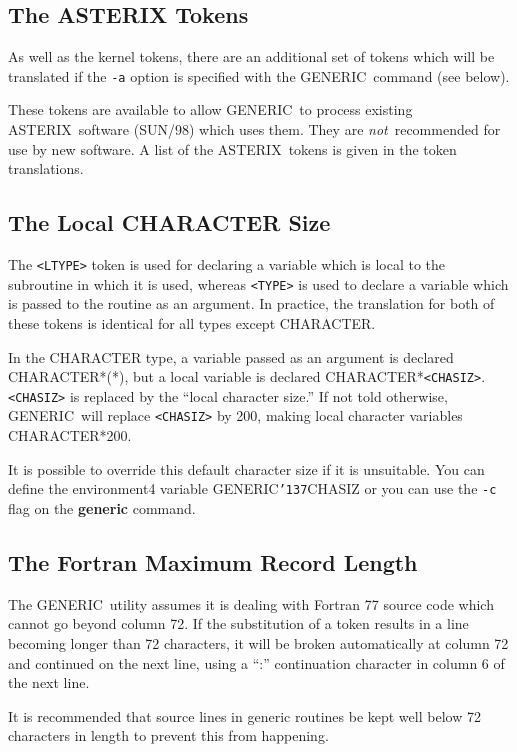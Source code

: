 \documentclass[twoside,11pt]{article}
\renewcommand{\_}{{\tt\char'137}}     %
\newcommand{\htmlref}[2]{#1}
\newcommand{\xref}[3]{#1}
\newcommand{\ASTERIX}{{\footnotesize ASTERIX}\normalsize}
\newcommand{\ASTERIXref}{\xref{\ASTERIX}{sun98}{}}
\newcommand{\GENERIC}{{\footnotesize GENERIC}\normalsize}
\newcommand{\latexelsehtml}[2]{#1}
\renewcommand{\latexelsehtml}[2]{#2}
\begin{document}
\subsection{The ASTERIX Tokens}

As well as the kernel tokens, there are an additional set of
tokens which will be translated if the {\tt -a} option is specified
with the \GENERIC\ command (see below).

These tokens are available to allow \GENERIC\ to process existing
\ASTERIXref\ software (SUN/98) which uses them.
They are {\em not}\ recommended for use by new software.
A list of the \ASTERIX\ tokens is given in 
\latexelsehtml{Appendix~\ref{ap_a}}{the
\htmlref{token translations}{ap_a}}.

\subsection{The Local CHARACTER Size}

The \verb+<LTYPE>+ token is used for declaring a variable which is local
to the subroutine in which it is used, whereas \verb+<TYPE>+ is used
to declare a variable which is passed to the routine as an argument.
In practice, the translation for both of these tokens is identical
for all types except CHARACTER.

In the CHARACTER type, a variable passed as an argument is declared
CHARACTER*(*), but a local variable is declared CHARACTER*\verb+<CHASIZ>+.
\verb+<CHASIZ>+ is replaced by the ``local character size.''
If not told otherwise, \GENERIC\ will replace \verb+<CHASIZ>+ by 200,
making local character variables CHARACTER*200.

It is possible to override this default character size
if it is unsuitable.  You can define the environment4 variable 
GENERIC\_CHASIZ or you can use the {\tt -c} flag on the 
{\bf generic} command.

\subsection{The Fortran Maximum Record Length}
 
The \GENERIC\ utility assumes it is dealing with Fortran 77
source code which cannot go beyond column 72.
If the substitution of a token results in a line becoming longer
than 72 characters, it will be broken automatically at column 72
and continued on the next line, using a ``:'' continuation character
in column 6 of the next line.

It is recommended that source lines in generic routines be kept
well below 72 characters in length to prevent this from happening.
\end{document}
